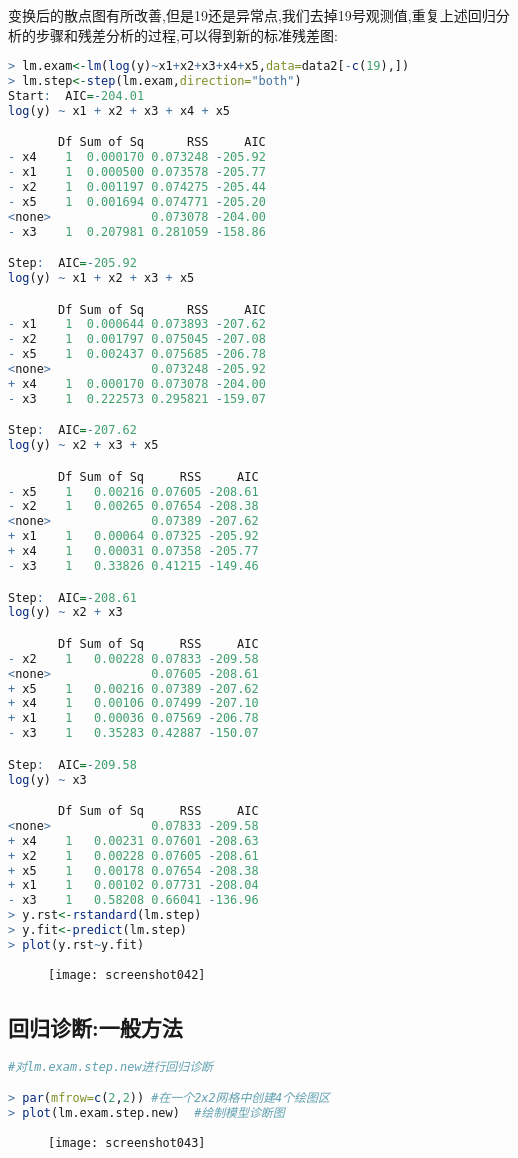 \documentclass[11pt,a4paper,oneside]{book}
\begin{document}
变换后的散点图有所改善,但是19还是异常点,我们去掉19号观测值,重复上述回归分析的步骤和残差分析的过程,可以得到新的标准残差图:
\begin{lstlisting}[language=r]
> lm.exam<-lm(log(y)~x1+x2+x3+x4+x5,data=data2[-c(19),])
> lm.step<-step(lm.exam,direction="both")
Start:  AIC=-204.01
log(y) ~ x1 + x2 + x3 + x4 + x5

       Df Sum of Sq      RSS     AIC
- x4    1  0.000170 0.073248 -205.92
- x1    1  0.000500 0.073578 -205.77
- x2    1  0.001197 0.074275 -205.44
- x5    1  0.001694 0.074771 -205.20
<none>              0.073078 -204.00
- x3    1  0.207981 0.281059 -158.86

Step:  AIC=-205.92
log(y) ~ x1 + x2 + x3 + x5

       Df Sum of Sq      RSS     AIC
- x1    1  0.000644 0.073893 -207.62
- x2    1  0.001797 0.075045 -207.08
- x5    1  0.002437 0.075685 -206.78
<none>              0.073248 -205.92
+ x4    1  0.000170 0.073078 -204.00
- x3    1  0.222573 0.295821 -159.07

Step:  AIC=-207.62
log(y) ~ x2 + x3 + x5

       Df Sum of Sq     RSS     AIC
- x5    1   0.00216 0.07605 -208.61
- x2    1   0.00265 0.07654 -208.38
<none>              0.07389 -207.62
+ x1    1   0.00064 0.07325 -205.92
+ x4    1   0.00031 0.07358 -205.77
- x3    1   0.33826 0.41215 -149.46

Step:  AIC=-208.61
log(y) ~ x2 + x3

       Df Sum of Sq     RSS     AIC
- x2    1   0.00228 0.07833 -209.58
<none>              0.07605 -208.61
+ x5    1   0.00216 0.07389 -207.62
+ x4    1   0.00106 0.07499 -207.10
+ x1    1   0.00036 0.07569 -206.78
- x3    1   0.35283 0.42887 -150.07

Step:  AIC=-209.58
log(y) ~ x3

       Df Sum of Sq     RSS     AIC
<none>              0.07833 -209.58
+ x4    1   0.00231 0.07601 -208.63
+ x2    1   0.00228 0.07605 -208.61
+ x5    1   0.00178 0.07654 -208.38
+ x1    1   0.00102 0.07731 -208.04
- x3    1   0.58208 0.66041 -136.96
> y.rst<-rstandard(lm.step)
> y.fit<-predict(lm.step)
> plot(y.rst~y.fit)
\end{lstlisting}
\begin{figure}[H]
	\centering
	\texttt{[image: screenshot042]}
\end{figure}

\subsection{回归诊断:一般方法}
\begin{lstlisting}[language=r]
#对lm.exam.step.new进行回归诊断

> par(mfrow=c(2,2)) #在一个2x2网格中创建4个绘图区
> plot(lm.exam.step.new)  #绘制模型诊断图
\end{lstlisting}
\begin{figure}[H]
	\centering
	\texttt{[image: screenshot043]}
\end{figure}
\end{document}
